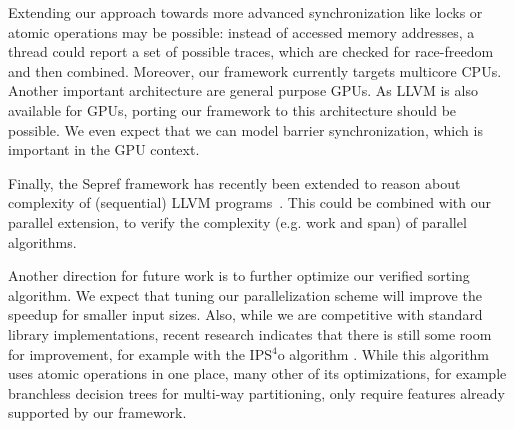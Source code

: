 \documentclass[sn-mathphys,Numbered]{sn-jnl}
\theoremstyle{thmstyleone}%
\theoremstyle{definition}%
\theoremstyle{thmstylethree}%
\begin{document}
      Extending our approach towards more advanced
      synchronization like locks or atomic operations may be possible: instead of accessed memory addresses,
      a thread could report a set of possible traces, which are checked for race-freedom and then combined.
      Moreover, our framework currently targets multicore CPUs. Another important architecture are general purpose GPUs.
      As LLVM is also available for GPUs, porting our framework to this architecture should be possible.
      We even expect that we can model barrier synchronization, which is important in the GPU context.

      Finally, the Sepref framework has recently been extended to reason about complexity of (sequential)
      LLVM programs~\cite{HaLa21-toplas,HaLa21}. This could be combined with our parallel extension, to verify the
      complexity (e.g. work and span) of parallel algorithms.

      Another direction for future work is to further optimize our verified sorting algorithm.
      We expect that tuning our parallelization scheme will improve the speedup for smaller input sizes.
      Also, while we are competitive with standard library implementations, recent research indicates that there is still
      some room for improvement, for example with the IPS$^4$o algorithm \cite{AWFS22}. While this algorithm uses atomic operations
      in one place, many other of its optimizations, for example branchless decision trees for multi-way partitioning,
      only require features already supported by our framework.

%
%
%
%
%
%
%





\end{document}
